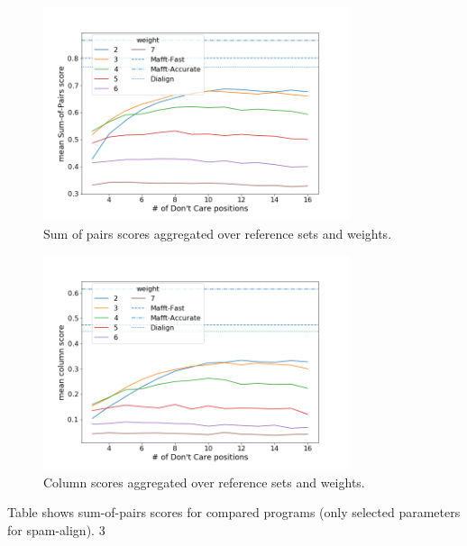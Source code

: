 \begin{figure}[h]
	\centering
	\includegraphics[width=0.8\textwidth]{../alignment-evaluation/sop-by-pattern-params.png}
	\caption{Sum of pairs scores aggregated over \bb reference sets and weights.}
	\label{}
\end{figure}
\begin{figure}[H]
	\centering
	\includegraphics[width=0.8\textwidth]{../alignment-evaluation/cs-by-pattern-params.png}
	\caption{Column scores aggregated over \bb reference sets and weights.}
	\label{}
\end{figure}

Table shows sum-of-pairs scores for compared programs (only selected parameters for spam-align).
3


